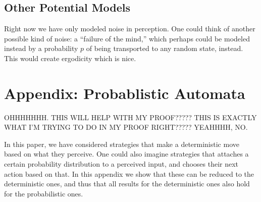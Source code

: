 \documentclass[11pt]{amsart}
\theoremstyle{definition}
\newtheorem{lemma}[theorem]{Lemma}
\theoremstyle{remark}
\begin{document}
    \subsection{Other Potential Models}

    Right now we have only modeled noise in perception. One could think of another possible kind of noise: a ``failure of the mind,'' which perhaps could be modeled instead by a probability $p$ of being transported to any random state, instead. This would create ergodicity which is nice.

    \iffalse

    \section{Appendix: Time average distributions}

    We might have periodicity, but for our purposes, we might as well extend the definition and look at periodic distributions as stationary too. The following two lemmas help with that.

    \begin{lemma}
      Given a starting distribution $v$ and a Markov matrix $M$, for every $\epsilon > 0$, there will exist a $k$ such that $|vP^{nk} - vP^{mk}| < \epsilon$ for all $n$ and $m$ $> 0$.
    \end{lemma}

    This proves that a Markov chain will always reach a periodic state.

    \begin{lemma}
      Suppose distributions form a chain $p_1 \to p_2 \to \cdots \to p_n \to p_1$. Then $\pi = \frac{p_1 + \ldots p_n}{n}$ is stationary.
    \end{lemma}

    This proves that we're able to talk about stationary distributions even when they don't really actually exist.

    \fi

    \section{Appendix: Probablistic Automata}

    OHHHHHHH. THIS WILL HELP WITH MY PROOF????? THIS IS EXACTLY WHAT I'M TRYING TO DO IN MY PROOF RIGHT????? YEAHHHH, NO.

    In this paper, we have considered strategies that make a deterministic move based on what they perceive. One could also imagine strategies that attaches a certain probability distribution to a perceived input, and chooses their next action based on that. In this appendix we show that these can be reduced to the deterministic ones, and thus that all results for the deterministic ones also hold for the probabilistic ones.
\end{document}
